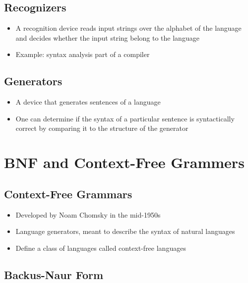 \documentclass[12pt]{article}
\begin{document}
\subsection{Recognizers}

\begin{itemize}
  \item A recognition device reads input strings over the alphabet of the language and decides whether the input string belong to the language
  \item Example: syntax analysis part of a compiler
\end{itemize}

\subsection{Generators}

\begin{itemize}
  \item A device that generates sentences of a language
  \item One can determine if the syntax of a particular sentence is syntactically correct by comparing it to the structure of the generator
\end{itemize}

\section{BNF and Context-Free Grammers}

\subsection{Context-Free Grammars}

\begin{itemize}
  \item Developed by Noam Chomsky in the mid-1950s
  \item Language generators, meant to describe the syntax of natural languages
  \item Define a class of languages called context-free languages
\end{itemize}

\subsection{Backus-Naur Form}
\end{document}
